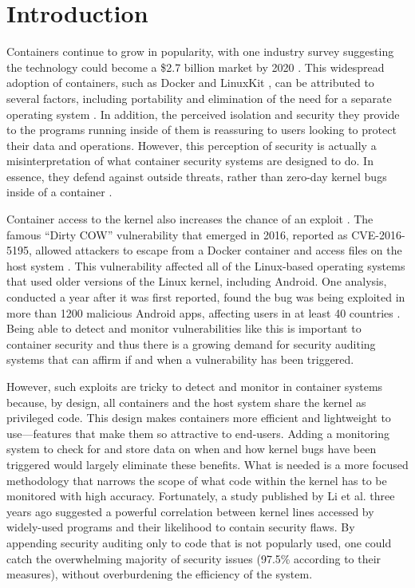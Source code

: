 \section{Introduction}
\label{sec.introduction}
Containers continue to grow in popularity, with one industry survey suggesting the technology could become a \$2.7 billion market by 2020 \cite{451-Research}.  
This widespread adoption of containers, such as Docker \cite{Docker} and LinuxKit \cite{LinuxKit}, can be attributed to several factors, 
including portability and elimination of the need for a separate operating system \cite{what-containers-do}. 
In addition, the perceived isolation and security they provide to the programs running inside of them is reassuring to users looking to protect their data and operations. 
However, this perception of security is actually a misinterpretation of what container security systems are designed to do. 
In essence, they defend against outside threats, rather than zero-day kernel bugs inside of a container \cite{containers-kernel-bug-tcp, containers-runc-vulnerability}.

Container access to the kernel also increases the chance of an exploit \cite{containers-kernel-bug-tcp}. 
The famous ``Dirty COW'' vulnerability that emerged in 2016, reported as CVE-2016-5195, allowed attackers to escape from a Docker container and access files on the host system \cite{dirty-cow}. 
This vulnerability affected all of the Linux-based operating systems that used older versions of the Linux kernel, including Android. 
One analysis, conducted a year after it was first reported, found the bug was being exploited in more than 1200 malicious Android apps, affecting users in at least 40 countries \cite{dirty-cow-impact}.  
Being able to detect and monitor vulnerabilities like this is important to container security and thus there is a growing demand for security auditing systems that can affirm if and when a vulnerability has been triggered.

However, such exploits are tricky to detect and monitor in container systems because, by design, all containers and the host system share the kernel as privileged code. 
This design makes containers more efficient and lightweight to use—features that make them so attractive to end-users. 
Adding a monitoring system to check for and store data on when and how kernel bugs have been triggered would  largely eliminate these benefits. 
What is needed is a more focused methodology that narrows the scope of what code within the kernel has to be monitored with high accuracy. 
Fortunately, a study published by Li et al. \cite{Lock-in-Pop} three years ago suggested a powerful correlation between kernel lines accessed by widely-used programs 
and their likelihood to contain security flaws. 
By appending security auditing only to code that is not popularly used, one could catch the overwhelming majority of security issues 
(97.5\% according to their measures), without overburdening the efficiency of the system.


